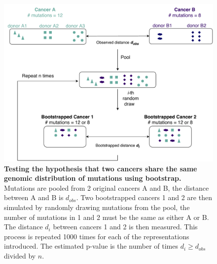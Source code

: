 \begin{figure}[h!]
    \centering
    \includegraphics[scale=0.6]{graphics/bootstrap_demo.pdf}
    \caption{\textbf{Testing the hypothesis that two cancers share the same genomic distribution of mutations using bootstrap.} Mutations are pooled from 2 original cancers A and B, the distance between A and B is $d_{obs}$. Two bootstrapped cancers 1 and 2 are then simulated by randomly drawing mutations from the pool, the number of mutations in 1 and 2 must be the same as either A or B. The distance $d_i$ between cancers 1 and 2 is then measured. This process is repeated 1000 times for each of the representations introduced. The estimated p-value is the number of times $d_i \geqslant d_{obs}$ divided by $n$.}
    \label{fig:bootstrap_demo}
\end{figure}
